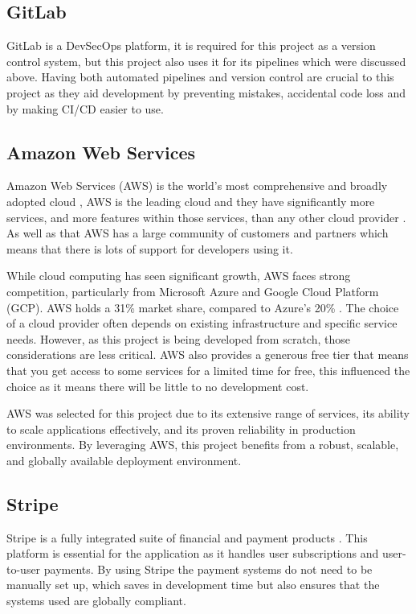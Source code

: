 \documentclass[]{project_report}
\begin{document}
\subsection{GitLab}

GitLab is a DevSecOps platform, it is required for this project as a version control system, but this project also uses it for its pipelines which were discussed above. Having both automated pipelines and version control are crucial to this project as they aid development by preventing mistakes, accidental code loss and by making CI/CD easier to use.

\subsection{Amazon Web Services}

Amazon Web Services (AWS) is the world’s most comprehensive and broadly adopted cloud \cite{what_is_aws}, AWS is the leading cloud and they have significantly more services, and more features within those services, than any other cloud provider \cite{what_is_aws}. As well as that AWS has a large community of customers and partners which means that there is lots of support for developers using it.  

While cloud computing has seen significant growth, AWS faces strong competition, particularly from Microsoft Azure and Google Cloud Platform (GCP). AWS holds a 31\% market share, compared to Azure's 20\% \cite{amazon_statistics}. The choice of a cloud provider often depends on existing infrastructure and specific service needs. However, as this project is being developed from scratch, those considerations are less critical. AWS also provides a generous free tier that means that you get access to some services for a limited time for free, this influenced the choice as it means there will be little to no development cost.

AWS was selected for this project due to its extensive range of services, its ability to scale applications effectively, and its proven reliability in production environments. By leveraging AWS, this project benefits from a robust, scalable, and globally available deployment environment.

\subsection{Stripe}

Stripe is a fully integrated suite of financial and payment products \cite{stripe}. This platform is essential for the application as it handles user subscriptions and user-to-user payments. By using Stripe the payment systems do not need to be manually set up, which saves in development time but also ensures that the systems used are globally compliant.
\end{document}
